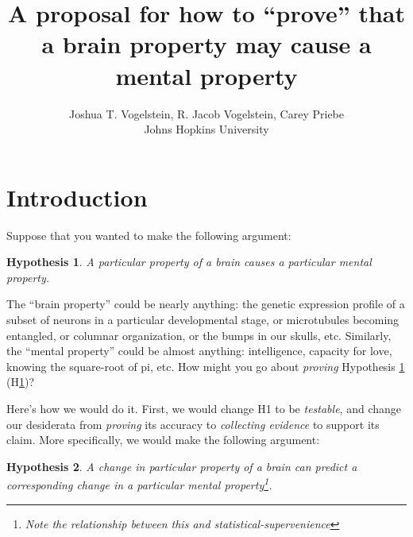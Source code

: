  
\usepackage{algorithmic} 
\usepackage{algorithm}

\newtheorem{goal}{Goal} 
\newtheorem{desid}{Desiderata} 
\newtheorem{hypo}{Hypothesis} 
\newcommand{\zz}{\mathbb{Z}} 
\newcommand{\nec}{NeCoG}

 

\title{A proposal for how to ``prove'' that a brain property may cause a mental property}

\author{Joshua T. Vogelstein, R. Jacob Vogelstein, Carey Priebe\\{Johns Hopkins University}}



\maketitle
\begin{abstract}
\end{abstract}

\section{Introduction} 

\label{sec:introduction}

Suppose that you wanted to make the following argument: 
\begin{hypo}
	\label{h1} A particular property of a brain causes a particular mental property. 
\end{hypo}

The ``brain property'' could be nearly anything: the genetic expression profile of a subset of neurons in a particular developmental stage, or microtubules becoming entangled, or columnar organization, or the bumps in our skulls, etc. Similarly, the ``mental property'' could be almost anything: intelligence, capacity for love, knowing the square-root of pi, etc. How might you go about \emph{proving} Hypothesis \ref{h1} (H\ref{h1})?

Here's how we would do it. First, we would change H1 to be \emph{testable}, and change our desiderata from \emph{proving} its accuracy to \emph{collecting evidence} to support its claim. More specifically, we would make the following argument:
\begin{hypo}
	\label{h2} A change in particular property of a brain can predict a corresponding change in a particular mental property\footnote{Note the relationship between this and \emph{statistical-supervenience}\cite{VogelsteinPriebe10}}. 
\end{hypo}

